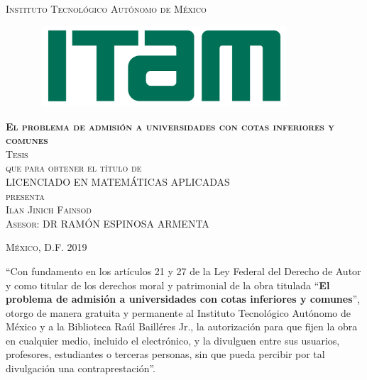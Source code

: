 \documentclass[11pt, oneside]{book}
\begin{document}
\begin{titlepage}
\begin{center}

\textsc{\Large Instituto Tecnológico Autónomo de México}\\[4em]

\begin{figure}[h]
\begin{center}
\includegraphics[width=9.7cm, height=3cm]{logo-ITAM}
\end{center}
\end{figure}

\vspace{4em}

\textsc{\huge \textbf{El problema de admisión a universidades con cotas inferiores y comunes}}\\[4em]

\textsc{\large Tesis}\\[1em]

\textsc{que para obtener el título de}\\[1em]

\textsc{LICENCIADO EN MATEMÁTICAS APLICADAS}\\[1em]

\textsc{presenta}\\[1em]

\textsc{\Large Ilan Jinich Fainsod}\\[1em]

\textsc{\large Asesor: DR RAMÓN ESPINOSA ARMENTA }

\end{center}

\vspace*{\fill}
\textsc{México, D.F. \hspace*{\fill} 2019}

\end{titlepage}



\thispagestyle{empty}
\vspace*{\fill}
\begingroup
``Con fundamento en los artículos 21 y 27 de la Ley Federal del Derecho de Autor y como titular de los derechos moral y patrimonial de la obra titulada ``\textbf{El problema de admisión a universidades con cotas inferiores y comunes}'', otorgo de manera gratuita y permanente al Instituto Tecnológico Autónomo de México y a la Biblioteca Raúl Bailléres Jr., la autorización para que fijen la obra en cualquier medio, incluido el electrónico, y la divulguen entre sus usuarios, profesores, estudiantes o terceras personas, sin que pueda percibir por tal divulgación una contraprestación''.
\end{document}
